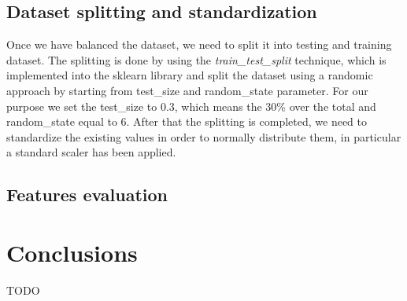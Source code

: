 \documentclass[sigconf]{acmart}
\begin{document}
    \subsection{Dataset splitting and standardization}
    Once we have balanced the dataset, we need to split it into testing and training dataset. The splitting is done by using the \textit{train\_test\_split} technique, which is implemented into the sklearn library and split the dataset using a randomic approach by starting from test\_size and random\_state parameter. For our purpose we set the test\_size to 0.3, which means the 30\% over the total and random\_state equal to 6. After that the splitting is completed, we need to standardize the existing values in order to normally distribute them, in particular a standard scaler has been applied.

    \subsection{Features evaluation}


    \section{Conclusions}
    TODO

    
    
\end{document}
